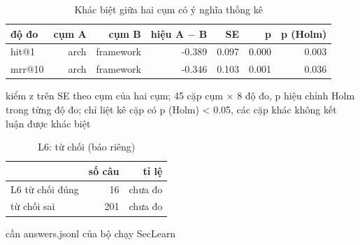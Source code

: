 \begin{table}[ht]
\centering
\caption{Khác biệt giữa hai cụm có ý nghĩa thống kê}
\begin{tabular}{lrrrrrr}
\toprule
độ đo & cụm A & cụm B & hiệu A $-$ B & SE & p & p (Holm) \\
\midrule
hit@1 & arch & framework & -0.389 & 0.097 & 0.000 & 0.003 \\
mrr@10 & arch & framework & -0.346 & 0.103 & 0.001 & 0.036 \\
\bottomrule
\end{tabular}
\par\smallskip\footnotesize kiểm z trên SE theo cụm của hai cụm; 45 cặp cụm × 8 độ đo, p hiệu chỉnh Holm trong từng độ đo; chỉ liệt kê cặp có p (Holm) < 0.05, các cặp khác không kết luận được khác biệt
\end{table}

\begin{table}[ht]
\centering
\caption{L6: từ chối (báo riêng)}
\begin{tabular}{lrr}
\toprule
 & số câu & tỉ lệ \\
\midrule
L6 từ chối đúng & 16 & chưa đo \\
từ chối sai & 201 & chưa đo \\
\bottomrule
\end{tabular}
\par\smallskip\footnotesize cần answers.jsonl của bộ chạy SecLearn
\end{table}
